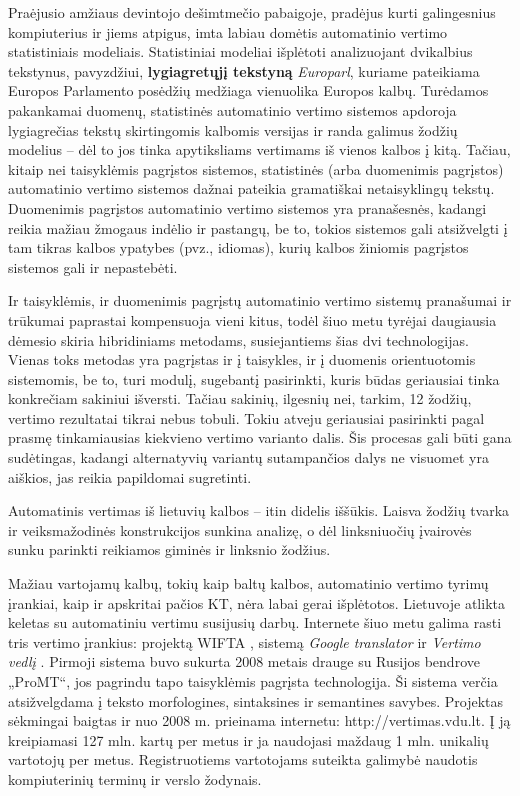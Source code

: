 \begin{multicols}{2}
 Praėjusio amžiaus devintojo dešimtmečio pabaigoje, pradėjus kurti galingesnius kompiuterius ir jiems atpigus, imta labiau domėtis automatinio vertimo statistiniais modeliais. Statistiniai modeliai išplėtoti analizuojant dvikalbius tekstynus, pavyzdžiui, \textbf{lygiagretųjį tekstyną} \textit{Europarl}, kuriame pateikiama Europos Parlamento posėdžių medžiaga vienuolika Europos kalbų. Turėdamos pakankamai duomenų, statistinės automatinio vertimo sistemos apdoroja lygiagrečias tekstų skirtingomis kalbomis versijas ir randa galimus žodžių modelius – dėl to jos tinka apytiksliams vertimams iš vienos kalbos į kitą. Tačiau, kitaip nei taisyklėmis pagrįstos sistemos, statistinės (arba duomenimis pagrįstos) automatinio vertimo sistemos dažnai pateikia gramatiškai netaisyklingų tekstų. Duomenimis pagrįstos automatinio vertimo sistemos yra pranašesnės, kadangi reikia mažiau žmogaus indėlio ir pastangų, be to, tokios sistemos gali atsižvelgti į tam tikras kalbos ypatybes (pvz., idiomas), kurių kalbos žiniomis pagrįstos sistemos gali ir nepastebėti.    


Ir taisyklėmis, ir duomenimis pagrįstų automatinio vertimo sistemų pranašumai ir trūkumai paprastai kompensuoja vieni kitus, todėl šiuo metu tyrėjai daugiausia dėmesio skiria hibridiniams metodams, susiejantiems šias dvi technologijas. Vienas toks metodas yra pagrįstas ir į taisykles, ir į duomenis orientuotomis sistemomis, be to, turi modulį, sugebantį pasirinkti, kuris būdas geriausiai tinka konkrečiam sakiniui išversti. Tačiau sakinių, ilgesnių nei, tarkim, 12 žodžių, vertimo rezultatai tikrai nebus tobuli. Tokiu atveju geriausiai pasirinkti pagal prasmę tinkamiausias kiekvieno vertimo varianto dalis. Šis procesas gali būti gana sudėtingas, kadangi alternatyvių variantų sutampančios dalys ne visuomet yra aiškios, jas reikia papildomai sugretinti. 

Automatinis vertimas iš lietuvių kalbos – itin didelis iššūkis. Laisva žodžių tvarka ir veiksmažodinės konstrukcijos sunkina analizę, o dėl linksniuočių įvairovės sunku parinkti reikiamos giminės ir linksnio žodžius.   

    Mažiau vartojamų kalbų, tokių kaip baltų kalbos, automatinio vertimo tyrimų įrankiai, kaip ir apskritai pačios KT, nėra labai gerai išplėtotos. Lietuvoje atlikta keletas su automatiniu vertimu susijusių darbų. Internete šiuo metu galima rasti tris vertimo įrankius: projektą WIFTA \cite{vertvdu},  sistemą \textit{Google translator} ir \textit{Vertimo vedlį} \cite{mvlab}. Pirmoji sistema buvo sukurta 2008 metais drauge su Rusijos bendrove „ProMT“, jos pagrindu tapo taisyklėmis pagrįsta technologija. Ši sistema verčia atsižvelgdama į teksto morfologines, sintaksines ir semantines savybes. Projektas sėkmingai baigtas ir nuo 2008 m. prieinama internetu: http://vertimas.vdu.lt. Į ją kreipiamasi 127 mln. kartų per metus ir ja naudojasi maždaug 1 mln. unikalių vartotojų per metus. Registruotiems vartotojams suteikta galimybė naudotis kompiuterinių terminų ir verslo žodynais.


\end{multicols}
